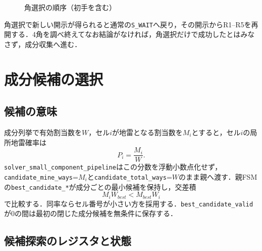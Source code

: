 \begin{figure}[tb]
  \centering
  \caption{角選択の順序（初手を含む）}
  \label{fig:corner-order}
\end{figure}

角選択で新しい開示が得られると通常の\texttt{S\_WAIT}へ戻り，その開示からR1--R5を再開する．4角を調べ終えてなお結論がなければ，角選択だけで成功したとはみなさず，成分収集へ進む．

\section{成分候補の選択}
\label{sec:probability-feedback}

\subsection{候補の意味}

成分列挙で有効割当数を$W$，セル$i$が地雷となる割当数を$M_i$とすると，セル$i$の局所地雷確率は
\begin{equation}
  P_i=\frac{M_i}{W}.
\end{equation}
\texttt{solver\_small\_component\_pipeline}はこの分数を浮動小数点化せず，\texttt{candidate\_mine\_ways}=$M_i$と\texttt{candidate\_total\_ways}=$W$のまま親へ渡す．親FSMの\texttt{best\_candidate\_*}が成分ごとの最小候補を保持し，交差積
\begin{equation}
  M_i W_{best}<M_{best}W_i
  \label{eq:stall-cross-product}
\end{equation}
で比較する．同率ならセル番号が小さい方を採用する．\texttt{best\_candidate\_valid}が0の間は最初の閉じた成分候補を無条件に保存する．

\subsection{候補探索のレジスタと状態}

